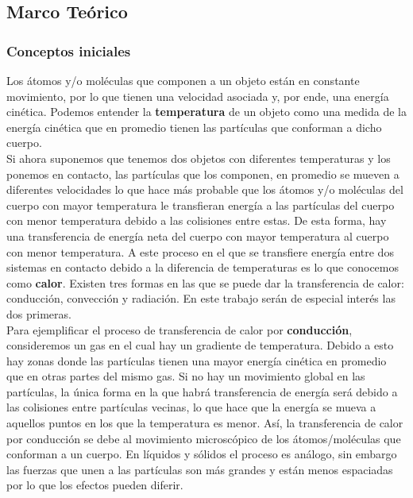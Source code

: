 \documentclass[12pt]{article}
\begin{document}
\subsection{Marco Teórico}
\subsubsection{Conceptos iniciales}

Los átomos y/o moléculas que componen a un objeto están en constante movimiento, por lo que tienen una velocidad asociada y, por ende, una energía cinética. Podemos entender la \textbf{temperatura} de un objeto como una medida de la energía cinética que en promedio tienen las partículas que conforman a dicho cuerpo. \\

Si ahora suponemos que tenemos dos objetos con diferentes temperaturas y los ponemos en contacto, las partículas que los componen, en promedio se mueven a diferentes velocidades lo que hace más probable que los átomos y/o moléculas del cuerpo con mayor temperatura le transfieran energía a las partículas del cuerpo con menor temperatura debido a las colisiones entre estas. De esta forma, hay una transferencia de energía neta del cuerpo con mayor temperatura al cuerpo con menor temperatura. A este proceso en el que se transfiere energía entre dos sistemas en contacto debido a la diferencia de temperaturas es lo que conocemos como \textbf{calor}. Existen tres formas en las que se puede dar la transferencia de calor: conducción, convección y radiación. En este trabajo serán de especial interés las dos primeras. \\ 

Para ejemplificar el proceso de transferencia de calor por \textbf{conducción}, consideremos un gas en el cual hay un gradiente de temperatura. Debido a esto hay zonas donde las partículas tienen una mayor energía cinética en promedio que en otras partes del mismo gas. Si no hay un movimiento global en las partículas, la única forma en la que habrá transferencia de energía será debido a las colisiones entre partículas vecinas, lo que hace que la energía se mueva a aquellos puntos en los que la temperatura es menor. Así, la transferencia de calor por conducción se debe al movimiento microscópico de los átomos/moléculas que conforman a un cuerpo. En líquidos y sólidos el proceso es análogo, sin embargo las fuerzas que unen a las partículas son más grandes y están menos espaciadas por lo que los efectos pueden diferir. \\
\end{document}
